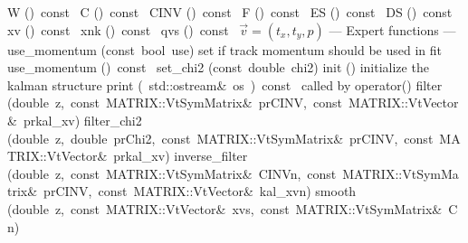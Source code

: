 \documentclass{article}
\begin{document}
\begin{cxxentry}
\begin{cxxclass}
\begin{cxxpublic}
        {}
        {}
        {}
\label{cxx.1.3.23}
        {W}
        {()\ const\ }
        {}
        {}
\label{cxx.1.3.24}
        {C}
        {()\ const\ }
        {}
        {}
\label{cxx.1.3.25}
        {CINV}
        {()\ const\ }
        {}
        {}
\label{cxx.1.3.26}
        {F}
        {()\ const\ }
        {}
        {}
\label{cxx.1.3.27}
        {ES}
        {()\ const\ }
        {}
        {}
\label{cxx.1.3.28}
        {DS}
        {()\ const\ }
        {}
        {}
\label{cxx.1.3.29}
        {xv}
        {()\ const\ }
        {}
        {}
\label{cxx.1.3.30}
        {xnk}
        {()\ const\ }
        {}
        {}
\label{cxx.1.3.31}
        {qvs}
        {()\ const\ }
        { $\vec{v} = (t_x,t_y,p)$}
        {}
\label{cxx.1.3.32}
\cxxitem{}
        {--- Expert functions --- }
        {}
        {}
        {}
\label{cxx.1.3.33}
        {use\_momentum}
        {(const\ bool\ use)}
        { set if track momentum should be used in fit}
        {}
\label{cxx.1.3.34}
        {use\_momentum}
        {()\ const\ }
        {}
        {}
\label{cxx.1.3.35}
        {set\_chi2}
        {(const\ double\ chi2)}
        {}
        {}
\label{cxx.1.3.36}
        {init}
        {()}
        { initialize the kalman structure}
        {}
\label{cxx.1.3.37}
        {print}
        {(\ std::ostream\&\ os\ )\ const\ }
        { called by operator\<\<()}
        {}
\label{cxx.1.3.38}
        {filter}
        {(double\ z,\ const\ MATRIX::VtSymMatrix\&\ prCINV,\ const\ MATRIX::VtVector\&\ prkal\_xv)}
        {}
        {}
\label{cxx.1.3.39}
        {filter\_chi2}
        {(double\ z,\ double\ prChi2,\ const\ MATRIX::VtSymMatrix\&\ prCINV,\ const\ MATRIX::VtVector\&\ prkal\_xv)}
        {}
        {}
\label{cxx.1.3.40}
        {inverse\_filter}
        {(double\ z,\ const\ MATRIX::VtSymMatrix\&\ CINVn,\ const\ MATRIX::VtSymMatrix\&\ prCINV,\ const\ MATRIX::VtVector\&\ kal\_xvn)}
        {}
        {}
\label{cxx.1.3.41}
        {smooth}
        {(double\ z,\ const\ MATRIX::VtVector\&\ xvs,\ const\ MATRIX::VtSymMatrix\&\ Cn)}
        {}

\end{cxxpublic}
\end{cxxclass}
\end{cxxentry}
\end{document}
